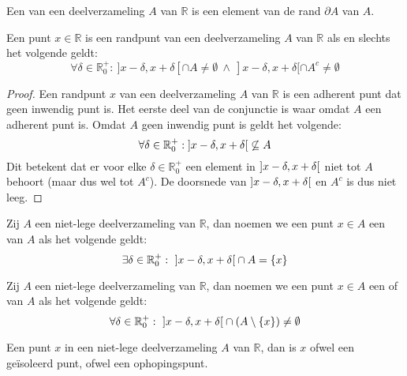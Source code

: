 \documentclass[main.tex]{subfiles}
\begin{document}
\begin{de}
  Een  van een deelverzameling $A$ van $\mathbb{R}$ is een element van de rand $\partial A$ van $A$.
\end{de}

\begin{st}
  Een punt $x\in \mathbb{R}$ is een randpunt van een deelverzameling $A$ van $\mathbb{R}$ als en slechts het volgende geldt:
  \[ \forall \delta \in \mathbb{R}_{0}^{+}:\ ]x-\delta,x+\delta[ \cap A \neq \emptyset\ \wedge\  ]x-\delta,x+\delta[ \cap A^{c} \neq \emptyset \]

  \begin{proof}
    Een randpunt $x$ van een deelverzameling $A$ van $\mathbb{R}$ is een adherent punt dat geen inwendig punt is.
    Het eerste deel van de conjunctie is waar omdat $A$ een adherent punt is.
    Omdat $A$ geen inwendig punt is geldt het volgende:
    \[ \forall \delta \in \mathbb{R}_{0}^{+}: \interval[open]{x-\delta}{x+\delta} \not\subseteq A \]
    Dit betekent dat er voor elke $\delta \in \mathbb{R}_{0}^{+}$ een element in $\interval[open]{x-\delta}{x+\delta}$ niet tot $A$ behoort (maar dus wel tot $A^{c}$).
    De doorsnede van $\interval[open]{x-\delta}{x+\delta}$ en $A^{c}$ is dus niet leeg.
  \end{proof}
\end{st}

\begin{de}
  Zij $A$ een niet-lege deelverzameling van $\mathbb{R}$, dan noemen we een punt $x\in A$ een  van $A$ als het volgende geldt:
  \[ \exists \delta \in \mathbb{R}_{0}^{+}:\ \interval[open]{x-\delta}{x+\delta} \cap A = \{ x \} \]
\end{de}

\begin{de}
  Zij $A$ een niet-lege deelverzameling van $\mathbb{R}$, dan noemen we een punt $x\in A$ een  of  van $A$ als het volgende geldt:
  \[ \forall \delta \in \mathbb{R}_{0}^{+}:\ \interval[open]{x-\delta}{x+\delta} \cap (A \setminus \{x\}) \neq \emptyset \]
\end{de}

\begin{opm}
  Een punt $x$ in een niet-lege deelverzameling $A$ van $\mathbb{R}$, dan is $x$ ofwel een ge\"isoleerd punt, ofwel een ophopingspunt.
\end{opm}
\end{document}
